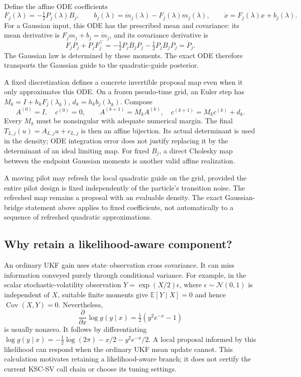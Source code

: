 \documentclass[11pt,a4paper]{article}
\newcommand{\E}{\mathbb E}
\newcommand{\Cov}{\operatorname{Cov}}
\newcommand{\Ncal}{\mathcal N}
\begin{document}
Define the affine ODE coefficients
\begin{equation}
\label{eq:local-ode}
 F_j(\lambda)=-\tfrac12P_j(\lambda)B_j,\qquad
 b_j(\lambda)=\dot m_j(\lambda)-F_j(\lambda)m_j(\lambda),
 \qquad \dot x=F_j(\lambda)x+b_j(\lambda).
\end{equation}
For a Gaussian input, this ODE has the prescribed mean and covariance:
its mean derivative is \(F_jm_j+b_j=\dot m_j\), and its covariance
derivative is
\[
 F_jP_j+P_jF_j^\top
 =-\tfrac12P_jB_jP_j-\tfrac12P_jB_jP_j
 =\dot P_j .
\]
The Gaussian law is determined by these moments. The exact ODE therefore
transports the Gaussian guide to the quadratic-guide posterior.

A fixed discretization defines a concrete invertible proposal map even
when it only approximates this ODE. On a frozen pseudo-time grid, an Euler
step has \(M_k=I+h_kF_j(\lambda_k)\), \(d_k=h_kb_j(\lambda_k)\).
Compose
\begin{equation}
\label{eq:affine-composition}
 A^{(0)}=I,\quad c^{(0)}=0,\qquad
 A^{(k+1)}=M_kA^{(k)},\quad
 c^{(k+1)}=M_kc^{(k)}+d_k .
\end{equation}
Every \(M_k\) must be nonsingular with adequate numerical margin.
The final \(T_{L,j}(u)=A_{L,j}u+c_{L,j}\) is then an affine bijection.
Its actual determinant is used in the density; ODE integration error
does not justify replacing it by the determinant of an ideal limiting map.
For fixed \(B_j\), a direct Cholesky map between the endpoint Gaussian
moments is another valid affine realization.

A moving pilot may refresh the local quadratic guide on the grid, provided
the entire pilot design is fixed independently of the particle's transition
noise. The refreshed map remains a proposal with an evaluable density.
The exact Gaussian-bridge statement above applies to fixed coefficients,
not automatically to a sequence of refreshed quadratic approximations.

\subsection{Why retain a likelihood-aware component?}

An ordinary UKF gain uses state--observation cross covariance. It can miss
information conveyed purely through conditional variance. For example, in
the scalar stochastic-volatility observation
\(Y=\exp(X/2)\epsilon\), where \(\epsilon\sim\Ncal(0,1)\) is independent
of \(X\), suitable finite moments give
\(\E[Y\mid X]=0\) and hence \(\Cov(X,Y)=0\).
Nevertheless,
\begin{equation}
\label{eq:sv-score}
 \frac{\partial}{\partial x}\log g(y\mid x)
 =\tfrac12(y^2e^{-x}-1)
\end{equation}
is usually nonzero. It follows by differentiating
\(\log g(y\mid x)=-\tfrac12\log(2\pi)-x/2-y^2e^{-x}/2\).
A local proposal informed by this likelihood can respond when the
ordinary UKF mean update cannot. This calculation motivates retaining a
likelihood-aware branch; it does not certify the current KSC-SV call chain
or choose its tuning settings.
\end{document}
